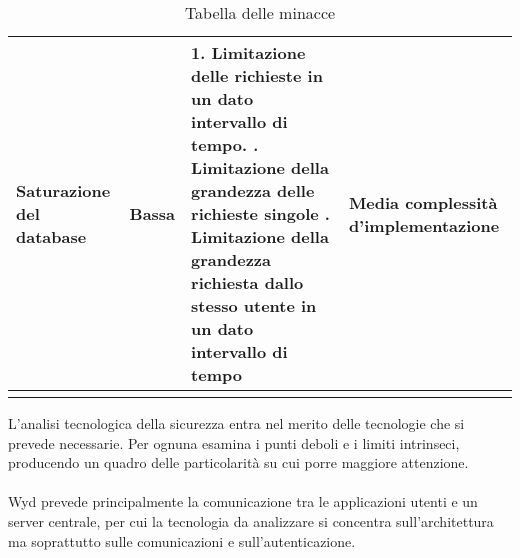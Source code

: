 \begin{longtable}{|P{3.3cm}|P{1.6cm}|P{6.2cm}|P{4cm}|}
        \hline
        Saturazione del database                          & Bassa            & 1. Limitazione delle richieste in un dato intervallo di tempo. . Limitazione della grandezza delle richieste singole . Limitazione della grandezza richiesta dallo stesso utente in un dato intervallo di tempo & Media complessità d'implementazione                              \\
        \hline
    \caption{Tabella delle minacce}
\end{longtable}

\clearpage

L'analisi tecnologica della sicurezza entra nel merito delle tecnologie che si prevede necessarie.
Per ognuna esamina i punti deboli e i limiti intrinseci,
producendo un quadro delle particolarità su cui porre maggiore attenzione.\\
\\
Wyd prevede principalmente la comunicazione tra le applicazioni utenti e un server centrale, 
per cui la tecnologia da analizzare si concentra sull'architettura 
ma soprattutto sulle comunicazioni e sull'autenticazione.\\


